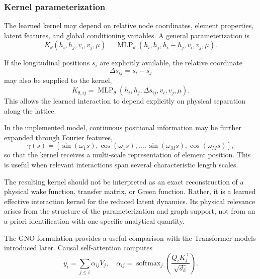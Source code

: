\subsubsection{Kernel parameterization}
\label{subsubsec:gno_kernel_parameterization}

The learned kernel may depend on relative node coordinates, element properties, latent features, and global conditioning variables. A general parameterization is
\begin{equation}
K_{\theta}
\left(
h_i,
h_j,
v_i,
v_j,
\mu
\right)
=
\operatorname{MLP}_{\theta}
\left(
h_i,
h_j,
h_i-h_j,
v_i,
v_j,
\mu
\right).
\label{eq:gno_kernel_mlp}
\end{equation}

If the longitudinal positions $s_i$ are explicitly available, the relative coordinate
\begin{equation}
\Delta s_{ij}
=
s_i-s_j
\end{equation}
may also be supplied to the kernel,
\begin{equation}
K_{\theta,ij}
=
\operatorname{MLP}_{\theta}
\left(
h_i,
h_j,
\Delta s_{ij},
v_i,
v_j,
\mu
\right).
\label{eq:gno_relative_kernel}
\end{equation}
This allows the learned interaction to depend explicitly on physical separation along the lattice.

In the implemented model, continuous positional information may be further expanded through Fourier features,
\begin{equation}
\gamma(s)
=
\left[
\sin(\omega_1 s),
\cos(\omega_1 s),
\ldots,
\sin(\omega_M s),
\cos(\omega_M s)
\right],
\label{eq:gno_fourier_features}
\end{equation}
so that the kernel receives a multi-scale representation of element position. This is useful when relevant interactions span several characteristic length scales.

The resulting kernel should not be interpreted as an exact reconstruction of a physical wake function, transfer matrix, or Green function. Rather, it is a learned effective interaction kernel for the reduced latent dynamics. Its physical relevance arises from the structure of the parameterization and graph support, not from an a priori identification with one specific analytical quantity.

The GNO formulation provides a useful comparison with the Transformer models introduced later\cite{wang_2026}. Causal self-attention computes
\begin{equation}
y_i
=
\sum_{j\le i}
\alpha_{ij}
V_j,\quad 
\alpha_{ij}
=
\operatorname{softmax}_{j}
\left(
\frac{
Q_iK_j^{\top}
}{
\sqrt{d_k}
}
\right).
\label{eq:gno_attention_general}
\end{equation}

